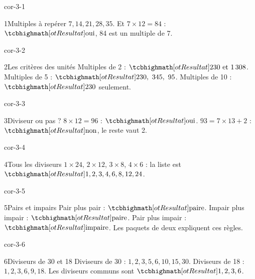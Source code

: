 \clearpage\pagestyle{otMain}\setlength{\otBlocEspacement}{2.5mm}\fontsize{11}{15}\selectfont{}
\begin{blocLivre}{cor-3-1}\begin{corrige}{1}{Multiples à repérer}
$7, 14, 21, 28, 35$. Et $7\times12=84$ : $\res{\text{oui}}$, 84 est un multiple de 7.
\end{corrige}\end{blocLivre}
\begin{blocLivre}{cor-3-2}\begin{corrige}{2}{Les critères des unités}
Multiples de 2 : $\res{230\text{ et }1\,308}$. Multiples de 5 : $\res{230,\ 345,\ 95}$. Multiples de 10 : $\res{230}$ seulement.
\end{corrige}\end{blocLivre}
\begin{blocLivre}{cor-3-3}\begin{corrige}{3}{Diviseur ou pas ?}
$8\times12=96$ : $\res{\text{oui}}$. $93=7\times13+2$ : $\res{\text{non}}$, le reste vaut 2.
\end{corrige}\end{blocLivre}
\begin{blocLivre}{cor-3-4}\begin{corrige}{4}{Tous les diviseurs}
$1\times24$, $2\times12$, $3\times8$, $4\times6$ : la liste est $\res{1, 2, 3, 4, 6, 8, 12, 24}$.
\end{corrige}\end{blocLivre}
\begin{blocLivre}{cor-3-5}\begin{corrige}{5}{Pairs et impairs}
Pair plus pair : $\res{\text{paire}}$. Impair plus impair : $\res{\text{paire}}$. Pair plus impair : $\res{\text{impaire}}$. Les paquets de deux expliquent ces règles.
\end{corrige}\end{blocLivre}
\begin{blocLivre}{cor-3-6}\begin{corrige}{6}{Diviseurs de 30 et 18}
Diviseurs de 30 : $1,2,3,5,6,10,15,30$. Diviseurs de 18 : $1,2,3,6,9,18$. Les diviseurs communs sont $\res{1, 2, 3, 6}$.
\end{corrige}\end{blocLivre}
